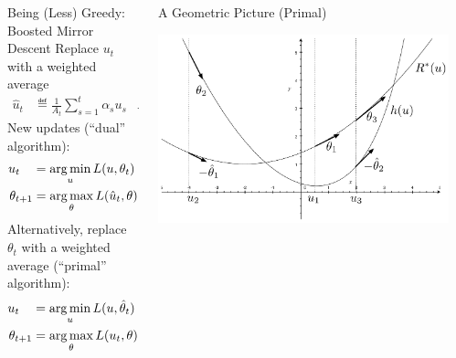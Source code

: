 \documentclass[final]{beamer}
\begin{document}
\begin{frame}{}
\begin{columns}
\begin{column}{0.46\linewidth}
\begin{columns}[t]
\begin{column}{.001\linewidth}\end{column}
\begin{column}{.4\linewidth}
\begin{block}{\large Being (Less) Greedy: \\ Boosted Mirror Descent}
Replace $u_t$ with a weighted average
\begin{align*}
\hat{u}_t &\eqdef \frac{1}{A_{t}} \sum_{s=1}^t \alpha_{s} u_s & A_{t} = \sum_{s=1}^{t} \alpha_{s}
\end{align*}
New updates (``dual'' algorithm):
\begin{align*}
u_t\,\,\,\,\,\, &= \argmin_{u} L(u,\theta_t)  = && \partial h^{*}(-\theta_{t}) \\
\theta_{t+1}    &= \argmax_{\theta} L(\hat{u}_t, \theta)  = &&\partial R^{*}(\hat u_{t})
\end{align*}
Alternatively, replace $\theta_{t}$ with a weighted average (``primal'' algorithm):
\begin{align*}
u_t\,\,\,\,\,\, &= \argmin_{u} L(u,\hat\theta_t) = && \partial h^{*}(-\hat\theta_{t}) \\
\theta_{t+1}    &= \argmax_{\theta} L(u_t, \theta) = &&\partial R^{*}(u_{t})
\end{align*}
\end{block}
\end{column}
\begin{column}{.53\linewidth}
\begin{block}{\large A Geometric Picture (Primal)}
\begin{center}
\includegraphics[width=10in]{figures/primal-demo.pdf}

\end{center}
\end{block}
\end{column}
\end{columns}
\end{column}
\end{columns}
\end{frame}
\end{document}
